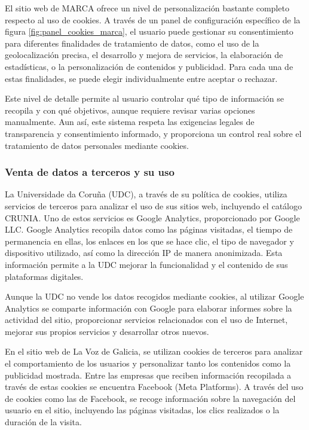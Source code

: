 El sitio web de MARCA ofrece un nivel de personalización bastante completo respecto al uso de cookies. A través de un panel de configuración específico de la figura \ref{fig:panel_cookies_marca}, el usuario puede gestionar su consentimiento para diferentes finalidades de tratamiento de datos, como el uso de la geolocalización precisa, el desarrollo y mejora de servicios, la elaboración de estadísticas, o la personalización de contenidos y publicidad. Para cada una de estas finalidades, se puede elegir individualmente entre aceptar o rechazar.

Este nivel de detalle permite al usuario controlar qué tipo de información se recopila y con qué objetivos, aunque requiere revisar varias opciones manualmente. Aun así, este sistema respeta las exigencias legales de transparencia y consentimiento informado, y proporciona un control real sobre el tratamiento de datos personales mediante cookies.


\subsubsection{Venta de datos a terceros y su uso}

La Universidade da Coruña (UDC), a través de su política de cookies, utiliza servicios de terceros para analizar el uso de sus sitios web, incluyendo el catálogo CRUNIA. Uno de estos servicios es Google Analytics, proporcionado por Google LLC. Google Analytics recopila datos como las páginas visitadas, el tiempo de permanencia en ellas, los enlaces en los que se hace clic, el tipo de navegador y dispositivo utilizado, así como la dirección IP de manera anonimizada. Esta información permite a la UDC mejorar la funcionalidad y el contenido de sus plataformas digitales. 

Aunque la UDC no vende los datos recogidos mediante cookies, al utilizar Google Analytics se comparte información con Google para elaborar informes sobre la actividad del sitio, proporcionar servicios relacionados con el uso de Internet, mejorar sus propios servicios y desarrollar otros nuevos.

En el sitio web de La Voz de Galicia, se utilizan cookies de terceros para analizar el comportamiento de los usuarios y personalizar tanto los contenidos como la publicidad mostrada. Entre las empresas que reciben información recopilada a través de estas cookies se encuentra Facebook (Meta Platforms). A través del uso de cookies como las de Facebook, se recoge información sobre la navegación del usuario en el sitio, incluyendo las páginas visitadas, los clics realizados o la duración de la visita.

